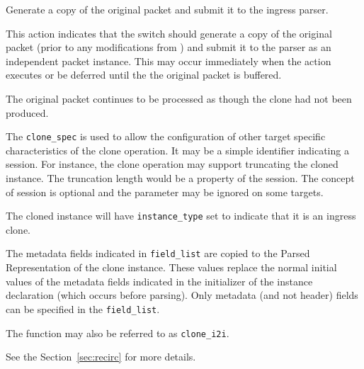 \documentclass[12pt]{article}
\begin{document}

{ %
Generate a copy of the original packet and submit it to the ingress parser.
}
{ %
}
{ %
This action indicates that the switch should generate a copy of the original 
packet (prior to any modifications from \matchaction) and submit it to the 
parser as an independent packet instance.  This may occur immediately when 
the action executes or be deferred until the the original packet is buffered. 
 

The original packet continues to be processed as though the clone had not 
been produced.

The \texttt{clone_spec} is used to allow the configuration of other target specific 
characteristics of the clone operation. It may be a simple identifier indicating 
a session. For instance, the clone operation may support truncating the cloned 
instance. The truncation length would be a property of the session. The concept 
of session is optional and the parameter may be ignored on some targets.

The cloned instance will have \texttt{instance_type} set to indicate that it is an 
ingress clone. 

The {\color{red}metadata} fields indicated in \texttt{field_list} are copied to the Parsed Representation 
of the clone instance. These values replace the normal initial values of the 
metadata fields indicated in the initializer of the instance declaration (which 
occurs before parsing). {\color{red} Only metadata (and not header) fields can be specified in the \texttt{field_list}.}

The function may also be referred to as \texttt{clone_i2i}.

See the Section~\ref{sec:recirc} for more details.
}

\end{document}
